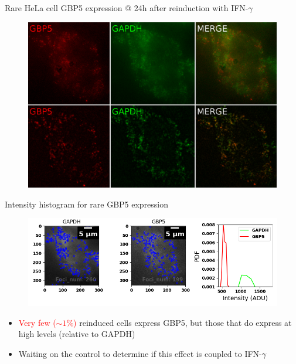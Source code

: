 \documentclass[aspectratio=1610]{beamer}					%
\begin{document}
\begin{frame}{Rare HeLa cell GBP5 expression @ 24h after reinduction with IFN-$\gamma$}
\begin{figure}
\includegraphics[width=12cm]{Stains.png}
\end{figure}
\end{frame}

\begin{frame}{Intensity histogram for rare GBP5 expression}
\begin{figure}
\includegraphics[width=14cm]{Detection.png}
\end{figure}
\begin{itemize}
\item \textcolor{red}{Very few ($\sim 1\%$)} reinduced cells express GBP5, but those that do express at high levels (relative to GAPDH)
\item Waiting on the control to determine if this effect is coupled to IFN-$\gamma$ 
\end{itemize}
\end{frame}
\end{document}
